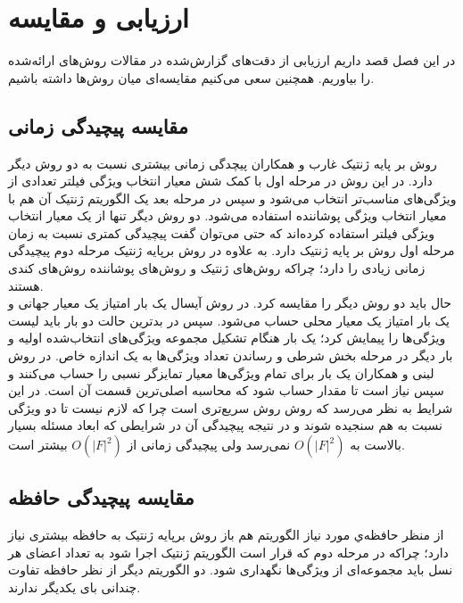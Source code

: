 \chapter{ارزیابی و مقایسه}
در این فصل قصد داریم ارزیابی از دقت‌های گزارش‌شده در مقالات روش‌های ارائه‌شده را بیاوریم. همچنین سعی می‌کنیم مقایسه‌ای میان روش‌ها داشته باشیم.

\section{مقایسه پیچیدگی زمانی}
روش بر پایه ژنتیک غارب و همکاران \cite{ghareb2016hybrid} پیچدگی زمانی بیشتری نسبت به دو روش دیگر دارد. در این روش در مرحله اول با کمک شش معیار انتخاب ویژگی فیلتر تعدادی از ویژگی‌های مناسب‌تر انتخاب می‌شود و سپس در مرحله بعد یک الگوریتم ژنتیک آن هم با معیار انتخاب ویژگی پوشاننده استفاده می‌شود. دو روش دیگر تنها از یک معیار انتخاب ویژگی فیلتر استفاده کرده‌اند که حتی می‌توان گفت پیچیدگی کمتری نسبت به زمان مرحله اول روش بر پایه ژنتیک دارد. به علاوه در روش برپایه ژنتیک مرحله دوم پیچیدگی زمانی زیادی را دارد؛ چراکه روش‌های ژنتیک و روش‌های پوشاننده روش‌های کندی هستند.
\\

حال باید دو روش دیگر را مقایسه کرد. در روش  آیسال یک بار امتیاز یک معیار جهانی و یک بار امتیاز یک معیار محلی حساب می‌شود. سپس در بدترین حالت دو بار باید لیست ویژگی‌ها را پیمایش کرد؛ یک بار هنگام تشکیل مجموعه ویژگی‌های انتخاب‌شده اولیه و بار دیگر در مرحله بخش شرطی و رساندن تعداد ویژگی‌ها به یک اندازه خاص.\cite{uysal2016improved} در روش  لبنی و همکاران یک بار برای تمام ویژگی‌ها معیار تمایزگر نسبی را حساب می‌کنند و سپس نیاز است تا مقدار  حساب شود که محاسبه  اصلی‌ترین قسمت آن است.\cite{labani2018novel} در این شرایط به نظر می‌رسد که روش  روش سریع‌تری است چرا که لازم نیست تا دو ویژگی نسبت به هم سنجیده شوند و در نتیجه پیچیدگی آن در شرایطی که ابعاد مسئله بسیار بالاست به
$O(|F|^2)$
نمی‌رسد ولی پیچیدگی زمانی  از
$O(|F|^2)$
بیشتر است.


\section{مقایسه پیچیدگی حافظه}  
از منظر حافظه‌ي مورد نیاز الگوریتم هم باز روش برپایه ژنتیک به حافظه بیشتری نیاز دارد؛ چراکه در مرحله دوم که قرار است الگوریتم ژنتیک اجرا شود به تعداد اعضای هر نسل باید مجموعه‌ای از ويژگی‌ها نگهداری شود. دو الگوریتم دیگر از نظر حافظه تفاوت چندانی بای یکدیگر ندارند.

